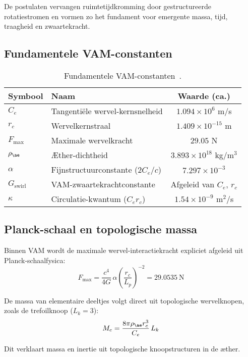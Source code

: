 De postulaten vervangen ruimtetijdkromming door gestructureerde rotatiestromen en vormen zo het fundament voor emergente massa, tijd, traagheid en zwaartekracht.

\subsection*{Fundamentele VAM-constanten}

\begin{table}[htbp]
    \centering
    \begin{tabular}{llc}
        \hline
        \toprule
        \textbf{Symbool} & \textbf{Naam} & \textbf{Waarde (ca.)} \\
        \hline
        \midrule
        $C_e$ & Tangentiële wervel-kernsnelheid & $1.094 \times 10^6$ m/s \\
        $r_c$ & Wervelkernstraal & $1.409 \times 10^{-15}$ m \\
        $F_{\text{max}}$ & Maximale wervelkracht & $29.05$ N \\
        $\rho_{\ae}$ & Æther-dichtheid & $3.893 \times 10^{18}$ kg/m$^3$ \\
        $\alpha$ & Fijnstructuurconstante ($2 C_e/c$) & $7.297 \times 10^{-3}$\\
        $G_{\text{swirl}}$ & VAM-zwaartekrachtconstante & Afgeleid van $C_e$, $r_c$\\
        $\kappa$ & Circulatie-kwantum ($C_e r_c$) & $1.54 \times 10^{-9}$ m$^2$/s \\
        \hline
        \bottomrule
    \end{tabular}
    \caption{Fundamentele VAM-constanten~\cite{vam2025field}.}
    \label{tab:constants}
\end{table}

\subsection*{Planck-schaal en topologische massa}

Binnen VAM wordt de maximale wervel-interactiekracht expliciet afgeleid uit Planck-schaalfysica:
\[
F_{\text{max}} = \frac{c^4}{4G}\,\alpha\left(\frac{r_c}{L_p}\right)^{-2} = 29.0535~\text{N}
\]

De massa van elementaire deeltjes volgt direct uit topologische wervelknopen, zoals de trefoilknoop ($L_k=3$):
\[
M_e = \frac{8\pi \rho_{\ae} r_c^3}{C_e}\, L_k
\]

Dit verklaart massa en inertie uit topologische knoopstructuren in de æther.

